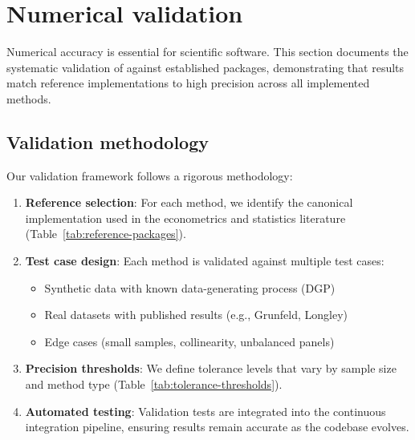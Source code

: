 
\section{Numerical validation} \label{sec:validation}

Numerical accuracy is essential for scientific software. This section documents
the systematic validation of  against established
 packages, demonstrating that results match reference implementations
to high precision across all implemented methods.

\subsection{Validation methodology} \label{sec:validation-methodology}

Our validation framework follows a rigorous methodology:

\begin{enumerate}
  \item \textbf{Reference selection}: For each method, we identify the canonical
     implementation used in the econometrics and statistics
    literature (Table~\ref{tab:reference-packages}).

  \item \textbf{Test case design}: Each method is validated against multiple
    test cases:
    \begin{itemize}
      \item Synthetic data with known data-generating process (DGP)
      \item Real datasets with published results (e.g., Grunfeld, Longley)
      \item Edge cases (small samples, collinearity, unbalanced panels)
    \end{itemize}

  \item \textbf{Precision thresholds}: We define tolerance levels that vary
    by sample size and method type (Table~\ref{tab:tolerance-thresholds}).

  \item \textbf{Automated testing}: Validation tests are integrated into the
    continuous integration pipeline, ensuring results remain accurate as the
    codebase evolves.
\end{enumerate}

